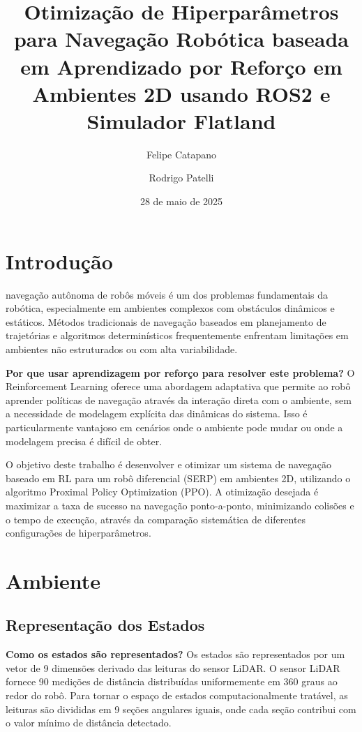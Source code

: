 \documentclass[9pt,a4paper,twoside]{tau}
\title{Otimização de Hiperparâmetros para Navegação Robótica baseada em Aprendizado por Reforço em Ambientes 2D usando ROS2 e Simulador Flatland}
\author[a]{Felipe Catapano}
\author[a]{Rodrigo Patelli}
\affil[a]{Engenharia da Computação, INSPER}
\date{28 de maio de 2025}
\begin{document}
		
	\maketitle
	\thispagestyle{firststyle}
	\tauabstract


\section{Introdução}

 navegação autônoma de robôs móveis é um dos problemas fundamentais da robótica, especialmente em ambientes complexos com obstáculos dinâmicos e estáticos. Métodos tradicionais de navegação baseados em planejamento de trajetórias e algoritmos determinísticos frequentemente enfrentam limitações em ambientes não estruturados ou com alta variabilidade.

\textbf{Por que usar aprendizagem por reforço para resolver este problema?} O Reinforcement Learning oferece uma abordagem adaptativa que permite ao robô aprender políticas de navegação através da interação direta com o ambiente, sem a necessidade de modelagem explícita das dinâmicas do sistema. Isso é particularmente vantajoso em cenários onde o ambiente pode mudar ou onde a modelagem precisa é difícil de obter.

O objetivo deste trabalho é desenvolver e otimizar um sistema de navegação baseado em RL para um robô diferencial (SERP) em ambientes 2D, utilizando o algoritmo Proximal Policy Optimization (PPO). A otimização desejada é maximizar a taxa de sucesso na navegação ponto-a-ponto, minimizando colisões e o tempo de execução, através da comparação sistemática de diferentes configurações de hiperparâmetros.

\section{Ambiente}

\subsection{Representação dos Estados}

\textbf{Como os estados são representados?} Os estados são representados por um vetor de 9 dimensões derivado das leituras do sensor LiDAR. O sensor LiDAR fornece 90 medições de distância distribuídas uniformemente em 360 graus ao redor do robô. Para tornar o espaço de estados computacionalmente tratável, as leituras são divididas em 9 seções angulares iguais, onde cada seção contribui com o valor mínimo de distância detectado.
\end{document}
